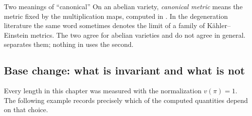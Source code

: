 \begin{warning}{Two meanings of ``canonical''}
On an abelian variety, \emph{canonical metric} means the metric fixed by the
multiplication maps, computed in .  In the
degeneration literature the same word sometimes denotes the limit of a
family of Kähler--Einstein metrics.  The two agree for abelian varieties and
do not agree in general.   separates
them; nothing in  uses the second.
\end{warning}

\subsection{Base change: what is invariant and what is not}
\label{sec:ch31-base-change}

Every length in this chapter was measured with the normalization
\(v(\pi)=1\).  The following example records precisely which of the computed
quantities depend on that choice.

